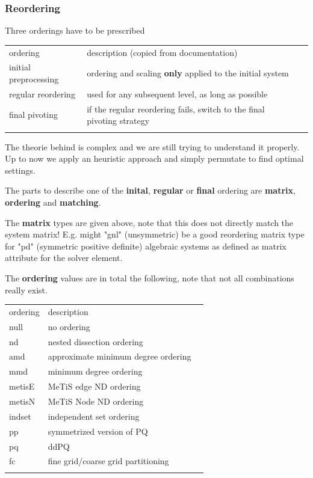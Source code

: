 \subsubsection*{Reordering}
Three orderings have to be prescribed
\begin{center}
\begin{tabular}{llp{}}
\hline\noalign{\smallskip}
ordering & description (copied from documentation) \\
\noalign{\smallskip}\hline\noalign{\smallskip}
initial preprocessing & ordering and scaling \textbf{only} applied to the initial system \\
regular reordering & used for any subsequent level, as long as possible \\
final pivoting & if the regular reordering fails, switch to the final pivoting strategy \\
\noalign{\smallskip}\hline
\end{tabular}
\end{center}
The theorie behind is complex and we are still trying to understand it properly. Up to now we apply an heuristic approach and simply permutate
to find optimal settings. 

The parts to describe one of the \textbf{inital}, \textbf{regular} or \textbf{final} ordering are \textbf{matrix}, \textbf{ordering} and \textbf{matching}.

The \textbf{matrix} types are given above, note that this does not directly match the system matrix! E.g. might "gnl" (unsymmetric) be a good reordering matrix type for "pd" (symmetric positive definite) algebraic systems as defined as matrix attribute for the solver element.

The \textbf{ordering} values are in total the following, note that not all combinations really exist.
\begin{center}
\begin{tabular}{llp{}}
\hline\noalign{\smallskip}
ordering & description \\
\noalign{\smallskip}\hline\noalign{\smallskip}
null & no ordering\\
nd & nested dissection ordering\\
amd & approximate minimum degree ordering\\
mmd & minimum degree ordering\\
metisE & MeTiS edge ND ordering\\
metisN & MeTiS Node ND ordering\\
indset & independent set ordering\\
pp & symmetrized version of PQ\\
pq & ddPQ\\
fc & fine grid/coarse grid partitioning\\
\noalign{\smallskip}\hline
\end{tabular}
\end{center}

